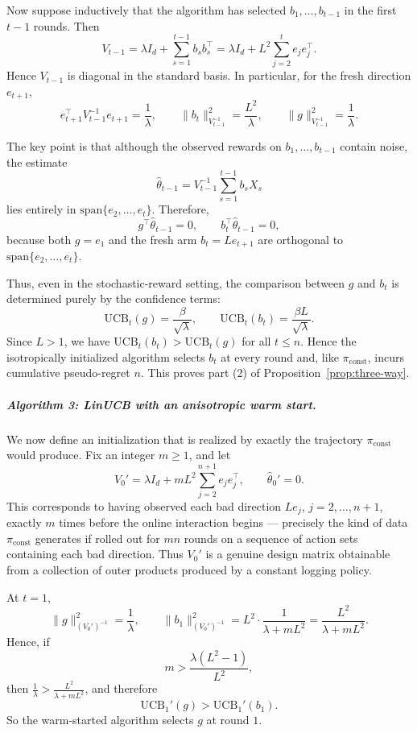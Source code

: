\documentclass{article}
\theoremstyle{definition}
\theoremstyle{remark}
\theoremstyle{remark}
\begin{document}
Now suppose inductively that the algorithm has selected $b_1,\dots,b_{t-1}$ in the first $t-1$ rounds. Then
\[
V_{t-1}
=
\lambda I_d+\sum_{s=1}^{t-1} b_s b_s^\top
=
\lambda I_d + L^2\sum_{j=2}^{t} e_j e_j^\top.
\]
Hence $V_{t-1}$ is diagonal in the standard basis. In particular, for the fresh direction $e_{t+1}$,
\[
e_{t+1}^\top V_{t-1}^{-1} e_{t+1}=\frac{1}{\lambda},
\qquad
\|b_t\|_{V_{t-1}^{-1}}^2=\frac{L^2}{\lambda},
\qquad
\|g\|_{V_{t-1}^{-1}}^2=\frac{1}{\lambda}.
\]

The key point is that although the observed rewards on $b_1,\dots,b_{t-1}$ contain noise, the estimate
\[
\hat{\theta}_{t-1}
=
V_{t-1}^{-1}\sum_{s=1}^{t-1} b_s X_s
\]
lies entirely in $\mathrm{span}\{e_2,\dots,e_t\}$. Therefore,
\[
g^\top \hat{\theta}_{t-1}=0,
\qquad
b_t^\top \hat{\theta}_{t-1}=0,
\]
because both $g=e_1$ and the fresh arm $b_t=L e_{t+1}$ are orthogonal to $\mathrm{span}\{e_2,\dots,e_t\}$.

Thus, even in the stochastic-reward setting, the comparison between $g$ and $b_t$ is determined purely by the confidence terms:
\[
\mathrm{UCB}_t(g)=\frac{\beta}{\sqrt{\lambda}},
\qquad
\mathrm{UCB}_t(b_t)=\frac{\beta L}{\sqrt{\lambda}}.
\]
Since $L>1$, we have $\mathrm{UCB}_t(b_t)>\mathrm{UCB}_t(g)$ for all $t\le n$. Hence the isotropically initialized algorithm selects $b_t$ at every round and, like $\pi_{\mathrm{const}}$, incurs cumulative pseudo-regret $n$. This proves part (2) of Proposition~\ref{prop:three-way}.

\subparagraph{Algorithm 3: LinUCB with an anisotropic warm start.}
We now define an initialization that is realized by exactly the trajectory $\pi_{\mathrm{const}}$ would produce. Fix an integer $m\ge 1$, and let
\[
V_0'
=
\lambda I_d + mL^2 \sum_{j=2}^{n+1} e_j e_j^\top,
\qquad
\hat{\theta}_0'=0.
\]
This corresponds to having observed each bad direction $L e_j$, $j=2,\dots,n+1$, exactly $m$ times before the online interaction begins --- precisely the kind of data $\pi_{\mathrm{const}}$ generates if rolled out for $mn$ rounds on a sequence of action sets containing each bad direction. Thus $V_0'$ is a genuine design matrix obtainable from a collection of outer products produced by a constant logging policy.

At $t=1$,
\[
\|g\|_{(V_0')^{-1}}^2=\frac{1}{\lambda},
\qquad
\|b_1\|_{(V_0')^{-1}}^2
=
L^2\cdot \frac{1}{\lambda+mL^2}
=
\frac{L^2}{\lambda+mL^2}.
\]
Hence, if
\[
m > \frac{\lambda(L^2-1)}{L^2},
\]
then $\frac{1}{\lambda}>\frac{L^2}{\lambda+mL^2}$, and therefore
\[
\mathrm{UCB}_1'(g)>\mathrm{UCB}_1'(b_1).
\]
So the warm-started algorithm selects $g$ at round $1$.
\end{document}
